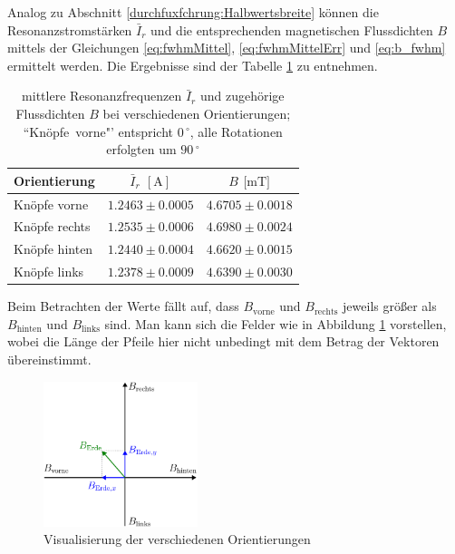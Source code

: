 \documentclass[12pt,a4paper]{scrartcl}
\numberwithin{equation}{section} %
\begin{document}
Analog zu Abschnitt \ref{durchfuxfchrung:Halbwertsbreite} können die Resonanzstromstärken $\bar{I}_r$ und die entsprechenden magnetischen Flussdichten $B$ mittels der Gleichungen \eqref{eq:fwhmMittel}, \eqref{eq:fwhmMittelErr} und \eqref{eq:b_fwhm} ermittelt werden. Die Ergebnisse sind der Tabelle \ref{table:Erdmagnetfeld Ergebnisse} zu entnehmen.

\begin{table}[h!]
	\centering
	\begin{tabular}{l|c|c}
		Orientierung & $\bar{I}_{r}$ $[\mathrm{A}]$ & $B$ $[\mathrm{mT]}$ \\
		\hline
		Knöpfe vorne  & $1.2463 \pm 0.0005$ & $4.6705 \pm 0.0018$ \\
		Knöpfe rechts & $1.2535 \pm 0.0006$ & $4.6980 \pm 0.0024$ \\
		Knöpfe hinten & $1.2440 \pm 0.0004$ & $4.6620 \pm 0.0015$  \\
		Knöpfe links     & $1.2378 \pm 0.0009$ & $4.6390 \pm 0.0030$
	\end{tabular}
	\caption{mittlere Resonanzfrequenzen $\bar I_r$ und zugehörige Flussdichten $B$ bei verschiedenen Orientierungen;
		``Knöpfe~vorne"' entspricht $0\,^\circ$, alle Rotationen erfolgten um $90\,^\circ$}
	\label{table:Erdmagnetfeld Ergebnisse}
\end{table}


Beim Betrachten der Werte fällt auf, dass $B_\mathrm{vorne}$ und $B_\mathrm{rechts}$ jeweils größer als $B_\mathrm{hinten}$ und $B_\mathrm{links}$ sind. Man kann sich die Felder wie in Abbildung \ref{fig:orientierungen} vorstellen, wobei die Länge der Pfeile hier nicht unbedingt mit dem Betrag der Vektoren übereinstimmt.

\begin{figure}[h]
	\centering
	\includegraphics[width=0.4\textwidth]{../media/B1.5/Erdmagnetfeld.pdf}
	\caption{Visualisierung der verschiedenen Orientierungen}
	\label{fig:orientierungen}
\end{figure}
\end{document}
